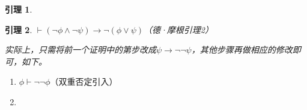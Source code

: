 \documentclass[punct=custom/kaiming,fontset=none]{ctexart}
\makeatletter
\renewenvironment{proof}[1][\proofname]{\par
  \pushQED{\qed}%
  \normalfont \topsep6\p@\@plus6\p@\relax
  \trivlist
  \item[\hskip\labelsep
    \bfseries
    #1%
    ]\ignorespaces
}{%
  \popQED\endtrivlist\@endpefalse
}
\newtheorem*{lemma*}{引理}
\theoremstyle{remark}
\let\proves\vdash
\makeatother
\begin{document}
\begin{description}
\begin{lemma*}
\begin{proof}
\begin{ND}
      \end{ND}
    \end{proof}
  \end{lemma*}
  \begin{lemma*}
    \label{lem:dm2}
    \(\proves (\neg\phi \land \neg\psi) \to \neg(\phi \lor \psi)\)\hfill（德·摩根引理2）
    \begin{proof}
      实际上，只需将前一个证明中的第步改成\(\psi \to \neg\neg\psi\)，其他步骤再做相应的修改即可，如下。
      \begin{ND}
        \label{1}
        \label{2}
        \label{3}
        \label{4}
      \end{ND}
    \end{proof}
  \end{lemma*}
  \begin{enumerate}
  \item \(\phi \proves \neg\neg\phi\)\hfill（\hypertarget{ded:dnIntro}{双重否定引入}）
    \begin{proof}
      \leavevmode
      \begin{ND}
        \label{1}
        \label{2}
      \end{ND}

\end{proof}
\end{enumerate}
\end{description}
\end{document}
